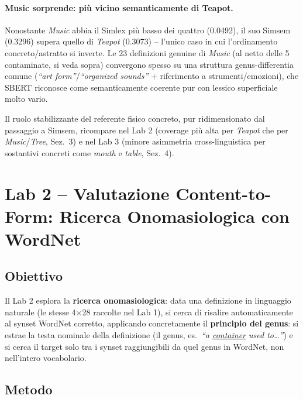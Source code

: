 \documentclass[12pt,a4paper]{article}
\begin{document}
\paragraph{Music sorprende: pi\`u vicino semanticamente di Teapot.} Nonostante \textit{Music} abbia il Simlex pi\`u basso dei quattro (0.0492), il suo Simsem (0.3296) supera quello di \textit{Teapot} (0.3073) -- l'unico caso in cui l'ordinamento concreto/astratto si inverte. Le 23 definizioni genuine di \textit{Music} (al netto delle 5 contaminate, si veda sopra) convergono spesso su una struttura genus-differentia comune (\textit{``art form''}/\textit{``organized sounds''} + riferimento a strumenti/emozioni), che SBERT riconosce come semanticamente coerente pur con lessico superficiale molto vario.

Il ruolo stabilizzante del referente fisico concreto, pur ridimensionato dal passaggio a Simsem, ricompare nel Lab 2 (coverage pi\`u alta per \textit{Teapot} che per \textit{Music}/\textit{Tree}, Sez.~3) e nel Lab 3 (minore asimmetria cross-linguistica per sostantivi concreti come \textit{mouth} e \textit{table}, Sez.~4).

\section{Lab 2 -- Valutazione Content-to-Form: Ricerca Onomasiologica con WordNet}

\subsection{Obiettivo}

Il Lab 2 esplora la \textbf{ricerca onomasiologica}: data una definizione in linguaggio naturale (le stesse 4$\times$28 raccolte nel Lab 1), si cerca di risalire automaticamente al synset WordNet corretto, applicando concretamente il \textbf{principio del genus}: si estrae la testa nominale della definizione (il genus, es.\ \textit{``a \underline{container} used to\dots''}) e si cerca il target solo tra i synset raggiungibili da quel genus in WordNet, non nell'intero vocabolario.

\subsection{Metodo}
\end{document}
